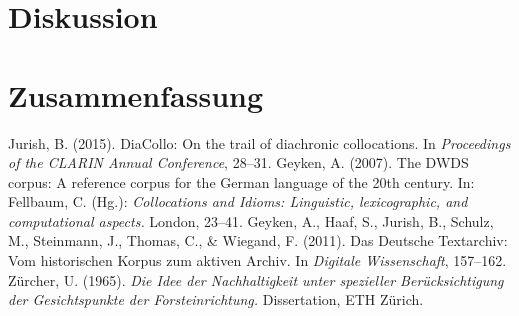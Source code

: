 \documentclass[
    german,
    a4paper,%
    12pt,%
    oneside,%
    toc=bibliography,
    final,
]{scrartcl}
\begin{document}
\section{Diskussion}
\label{sec:diskussion}


\section{Zusammenfassung}
\label{sec:zusammenfassung}



\newpage
\begin{thebibliography}{9}


 Jurish, B. (2015). DiaCollo: On the trail of diachronic collocations. In \textit{Proceedings of the CLARIN Annual Conference}, 28–31.
 Geyken, A. (2007). The DWDS corpus: A reference corpus for the German language of the 20th century. In: Fellbaum, C. (Hg.): \textit{Collocations and Idioms: Linguistic, lexicographic, and computational aspects.} London, 23–41.
 Geyken, A., Haaf, S., Jurish, B., Schulz, M., Steinmann, J., Thomas, C., \& Wiegand, F. (2011). Das Deutsche Textarchiv: Vom historischen Korpus zum aktiven Archiv. In \textit{Digitale Wissenschaft}, 157–162.
 Zürcher, U. (1965). \textit{Die Idee der Nachhaltigkeit unter spezieller Berücksichtigung der Gesichtspunkte der Forsteinrichtung.} Dissertation, ETH Zürich.

\end{thebibliography}
\end{document}
